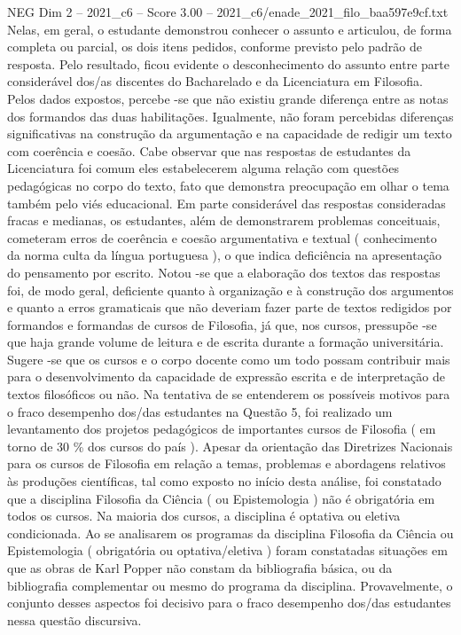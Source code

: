 \begin{textsample}{NEG Dim 2 – 2021\_c6 – Score 3.00 – 2021\_c6/enade\_2021\_filo\_baa597e9cf.txt}
Nelas, em geral, o estudante demonstrou conhecer o assunto e articulou, de forma completa ou parcial, os dois itens pedidos, conforme previsto pelo padrão de resposta.
Pelo resultado, ficou evidente o desconhecimento do assunto entre parte considerável dos/as discentes do Bacharelado e da Licenciatura em Filosofia.
Pelos dados expostos, percebe -se que não existiu grande diferença entre as notas dos formandos das duas habilitações.
Igualmente, não foram percebidas diferenças significativas na construção da argumentação e na capacidade de redigir um texto com coerência e coesão.
Cabe observar que nas respostas de estudantes da Licenciatura foi comum eles estabelecerem alguma relação com questões pedagógicas no corpo do texto, fato que demonstra preocupação em olhar o tema também pelo viés educacional.
Em parte considerável das respostas consideradas fracas e medianas, os estudantes, além de demonstrarem problemas conceituais, cometeram erros de coerência e coesão argumentativa e textual ( conhecimento da norma culta da língua portuguesa ), o que indica deficiência na apresentação do pensamento por escrito.
Notou -se que a elaboração dos textos das respostas foi, de modo geral, deficiente quanto à organização e à construção dos argumentos e quanto a erros gramaticais que não deveriam fazer parte de textos redigidos por formandos e formandas de cursos de Filosofia, já que, nos cursos, pressupõe -se que haja grande volume de leitura e de escrita durante a formação universitária.
Sugere -se que os cursos e o corpo docente como um todo possam contribuir mais para o desenvolvimento da capacidade de expressão escrita e de interpretação de textos filosóficos ou não.
Na tentativa de se entenderem os possíveis motivos para o fraco desempenho dos/das estudantes na Questão 5, foi realizado um levantamento dos projetos pedagógicos de importantes cursos de Filosofia ( em torno de 30 \% dos cursos do país ).
Apesar da orientação das Diretrizes Nacionais para os cursos de Filosofia em relação a temas, problemas e abordagens relativos às produções científicas, tal como exposto no início desta análise, foi constatado que a disciplina Filosofia da Ciência ( ou Epistemologia ) não é obrigatória em todos os cursos.
Na maioria dos cursos, a disciplina é optativa ou eletiva condicionada.
Ao se analisarem os programas da disciplina Filosofia da Ciência ou Epistemologia ( obrigatória ou optativa/eletiva ) foram constatadas situações em que as obras de Karl Popper não constam da bibliografia básica, ou da bibliografia complementar ou mesmo do programa da disciplina.
Provavelmente, o conjunto desses aspectos foi decisivo para o fraco desempenho dos/das estudantes nessa questão discursiva.

\end{textsample}
